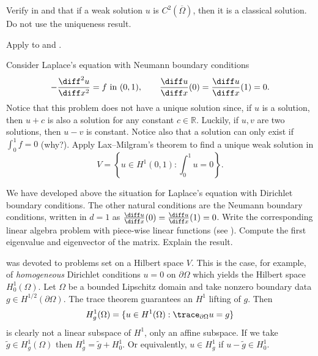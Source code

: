 \begin{exercises}
\ex Verify in  and  that if a weak solution $u$ is $C^2 (\overline \Omega)$, then it is a classical solution. Do not use the uniqueness result.

\ex[] Apply  to  and .

\ex[] Consider Laplace's equation with Neumann boundary conditions
\begin{equation*}
    -\frac{\diff^2 u}{\diff x^2} = f \text{ in } (0,1), \qquad \frac{\diff u}{\diff x}(0) = \frac{\diff u}{\diff x}(1) = 0.
\end{equation*}
Notice that this problem does not have a unique solution since, if $u$ is a solution, then $u + c$ is also a solution for any constant $c \in \mathbb R$.
Luckily, if $u, v$ are two solutions, then $u - v$ is constant.
Notice also that a solution can only exist if $\int_0^1 f = 0$ (why?).
Apply Lax--Milgram's theorem to find a unique weak solution in
\begin{equation*}
    V = \left\{ u \in H^1 (0,1) : \int_0^1 u = 0 \right\}.
\end{equation*}

We have developed above the situation for Laplace's equation with Dirichlet boundary conditions. The other natural conditions are the Neumann boundary conditions, written in $d = 1$ as $\frac{\diff u}{\diff x} (0) = \frac{\diff u}{\diff x} (1) = 0$. Write the corresponding linear algebra problem with piece-wise linear functions (see ). Compute the first eigenvalue and eigenvector of the matrix. Explain the result.

 was devoted to problems set on a Hilbert space $V$. This is the case, for example, of \emph{homogeneous} Dirichlet conditions $u = 0$ on $\partial \Omega$ which yields the Hilbert space $H^1_0 (\Omega)$. Let $\Omega$ be a bounded Lipschitz domain and take nonzero boundary data $g \in H^{1/2}(\partial\Omega)$. The trace theorem guarantees an $H^1$ lifting of $g$. Then
\begin{equation*}
    H_g^1 (\Omega) = \{u \in H^1(\Omega) : \trace_{\partial \Omega} u = g \}
\end{equation*}
is clearly not a linear subspace of $H^1$, only an affine subspace. If we take $\tilde g \in H_g^1 (\Omega)$ then $H^1_g = \tilde g + H_0^1$. Or equivalently, $u \in H^1_g$ if $u - \tilde g \in H_0^1$.


\end{exercises}
